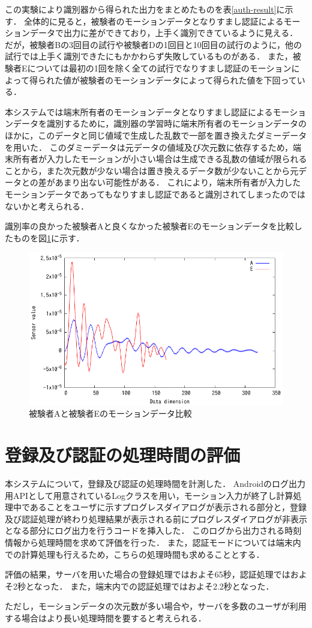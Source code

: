 この実験により識別器から得られた出力をまとめたものを表\ref{auth-result}に示す．
全体的に見ると，被験者のモーションデータとなりすまし認証によるモーションデータで出力に差ができており，上手く識別できているように見える．
だが，被験者Bの3回目の試行や被験者Dの1回目と10回目の試行のように，他の試行では上手く識別できたにもかかわらず失敗しているものがある．
また，被験者Eについては最初の1回を除く全ての試行でなりすまし認証のモーションによって得られた値が被験者のモーションデータによって得られた値を下回っている．


本システムでは端末所有者のモーションデータとなりすまし認証によるモーションデータを識別するために，識別器の学習時に端末所有者のモーションデータのほかに，このデータと同じ値域で生成した乱数で一部を置き換えたダミーデータを用いた．
このダミーデータは元データの値域及び次元数に依存するため，端末所有者が入力したモーションが小さい場合は生成できる乱数の値域が限られることから，また次元数が少ない場合は置き換えるデータ数が少ないことから元データとの差があまり出ない可能性がある．
これにより，端末所有者が入力したモーションデータであってもなりすまし認証であると識別されてしまったのではないかと考えられる．

識別率の良かった被験者Aと良くなかった被験者Eのモーションデータを比較したものを図\ref{compare}に示す．

\begin{figure}[hbtp]
  \centering
  \includegraphics[bb=0 0 360 216, width=12cm]{Graphs/comp.pdf}
  \caption{被験者Aと被験者Eのモーションデータ比較}
  \label{compare}
\end{figure}

\section{登録及び認証の処理時間の評価}
本システムについて，登録及び認証の処理時間を計測した．
Androidのログ出力用APIとして用意されているLogクラス\cite{5-log}を用い，モーション入力が終了し計算処理中であることをユーザに示すプログレスダイアログが表示される部分と，登録及び認証処理が終わり処理結果が表示される前にプログレスダイアログが非表示となる部分にログ出力を行うコードを挿入した．
このログから出力される時刻情報から処理時間を求めて評価を行った．
また，認証モードについては端末内での計算処理も行えるため，こちらの処理時間も求めることとする．

評価の結果，サーバを用いた場合の登録処理ではおよそ65秒，認証処理ではおよそ2秒となった．
また，端末内での認証処理ではおよそ2.2秒となった．

ただし，モーションデータの次元数が多い場合や，サーバを多数のユーザが利用する場合はより長い処理時間を要すると考えられる．
